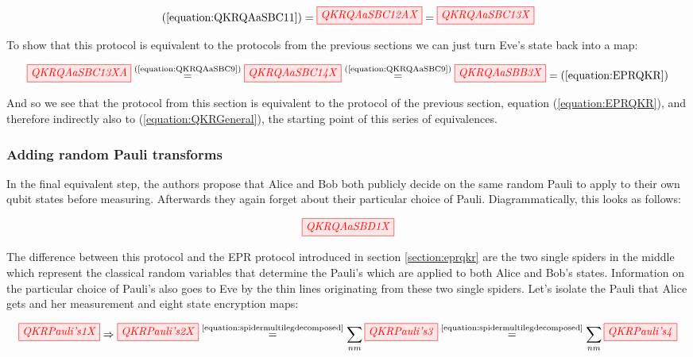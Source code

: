 \documentclass[]{article}
\newcommand{\equaltext}[1]{\ensuremath{\stackrel{\text{#1}}{=}}}
\begin{document}
\begin{equation}
	\label{equation:QKRQAaSBC13}
	(\ref{equation:QKRQAaSBC11}) = \tikzfig{QKRQAaSBC12AX} = \tikzfig{QKRQAaSBC13X}
\end{equation}

To show that this protocol is equivalent to the protocols from the previous sections we can just turn Eve's state back into a map:

\begin{equation}
\label{equation:QKRQAaSBBFinalResult}
	\tikzfig{QKRQAaSBC13XA} \equaltext{(\ref{equation:QKRQAaSBC9})} \tikzfig{QKRQAaSBC14X} \equaltext{(\ref{equation:QKRQAaSBC9})} \tikzfig{QKRQAaSBB3X} = (\ref{equation:EPRQKR})
\end{equation}

And so we see that the protocol from this section is equivalent to the protocol of the previous section, equation (\ref{equation:EPRQKR}), and therefore indirectly also to (\ref{equation:QKRGeneral}), the starting point of this series of equivalences.

\subsubsection{Adding random Pauli transforms}

In the final equivalent step, the authors propose that Alice and Bob both publicly decide on the same random Pauli to apply to their own qubit states before measuring. Afterwards they again forget about their particular choice of Pauli. Diagrammatically, this looks as follows: 

\begin{equation}
\label{equation:QKRQAaSBD1}
\tikzfig{QKRQAaSBD1X}
\end{equation}

The difference between this protocol and the EPR protocol introduced in section \ref{section:eprqkr} are the two single spiders in the middle which represent the classical random variables that determine the Pauli's which are applied to both Alice and Bob's states. Information on the particular choice of Pauli's also goes to Eve by the thin lines originating from these two single spiders. Let's isolate the Pauli that Alice gets and her measurement and eight state encryption maps:

\begin{equation}
	\label{equation:QKRPauli's}
	\tikzfig{QKRPauli's1X} \Rightarrow \tikzfig{QKRPauli's2X} \equaltext{\ref{equation:spidermultilegdecomposed}} \sum\limits_{nm} \tikzfig{QKRPauli's3}  \equaltext{\ref{equation:spidermultilegdecomposed}} \sum\limits_{nm} \tikzfig{QKRPauli's4}
\end{equation}
\end{document}
